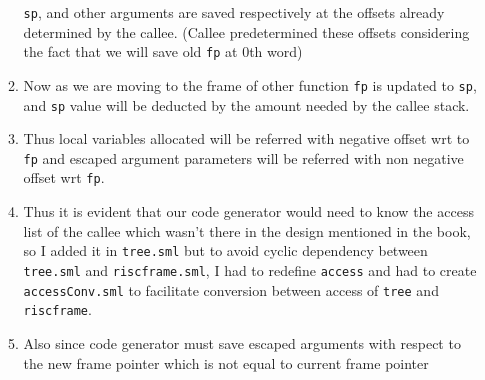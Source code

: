 \begin{enumerate}
\begin{enumerate}
		            \texttt{sp},
		            and other arguments are saved respectively at the offsets already
		            determined by the callee. (Callee predetermined these offsets
		            considering the fact that we will save old
		            \texttt{fp}
		            at 0th word)
		      \item
		            Now as we are moving to the frame of other function
		            \texttt{fp}
		            is updated to
		            \texttt{sp},
		            and
		            \texttt{sp}
		            value will be deducted by the amount needed by the callee stack.
		      \item
		            Thus local variables allocated will be referred with negative offset
		            wrt to
		            \texttt{fp}
		            and escaped argument parameters will be referred with non negative
		            offset wrt
		            \texttt{fp}.
		      \item
		            Thus it is evident that our code generator would need to know the
		            access list of the callee which wasn't there in the design mentioned
		            in the book, so I added it in
		            \texttt{tree.sml}
		            but to avoid cyclic dependency between
		            \texttt{tree.sml}
		            and
		            \texttt{riscframe.sml},
		            I had to redefine
		            \texttt{access}
		            and had to create
		            \texttt{accessConv.sml}
		            to facilitate conversion between access of
		            \texttt{tree}
		            and
		            \texttt{riscframe}.
		      \item
		            Also since code generator must save escaped arguments with respect
		            to the new frame pointer which is not equal to current frame pointer

\end{enumerate}
\end{enumerate}

